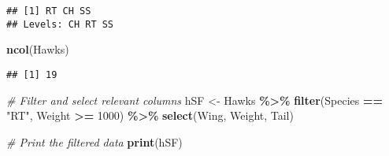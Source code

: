 \documentclass[
]{article}
\newenvironment{Shaded}{\begin{snugshade}}{\end{snugshade}}
\newcommand{\CommentTok}[1]{\textcolor[rgb]{0.56,0.35,0.01}{\textit{#1}}}
\newcommand{\DecValTok}[1]{\textcolor[rgb]{0.00,0.00,0.81}{#1}}
\newcommand{\FunctionTok}[1]{\textcolor[rgb]{0.13,0.29,0.53}{\textbf{#1}}}
\newcommand{\NormalTok}[1]{#1}
\newcommand{\OtherTok}[1]{\textcolor[rgb]{0.56,0.35,0.01}{#1}}
\newcommand{\SpecialCharTok}[1]{\textcolor[rgb]{0.81,0.36,0.00}{\textbf{#1}}}
\newcommand{\StringTok}[1]{\textcolor[rgb]{0.31,0.60,0.02}{#1}}
\begin{document}
\begin{Shaded}
\end{Shaded}

\begin{verbatim}
## [1] RT CH SS
## Levels: CH RT SS
\end{verbatim}

\begin{Shaded}
\begin{Highlighting}[]
\FunctionTok{ncol}\NormalTok{(Hawks) }
\end{Highlighting}
\end{Shaded}

\begin{verbatim}
## [1] 19
\end{verbatim}

\begin{Shaded}
\begin{Highlighting}[]
\CommentTok{\# Filter and select relevant columns}
\NormalTok{hSF }\OtherTok{\textless{}{-}}\NormalTok{ Hawks }\SpecialCharTok{\%\textgreater{}\%}
  \FunctionTok{filter}\NormalTok{(Species }\SpecialCharTok{==} \StringTok{"RT"}\NormalTok{, Weight }\SpecialCharTok{\textgreater{}=} \DecValTok{1000}\NormalTok{) }\SpecialCharTok{\%\textgreater{}\%}
  \FunctionTok{select}\NormalTok{(Wing, Weight, Tail)}


\CommentTok{\# Print the filtered data}
\FunctionTok{print}\NormalTok{(hSF)}
\end{Highlighting}
\end{Shaded}
\end{document}
